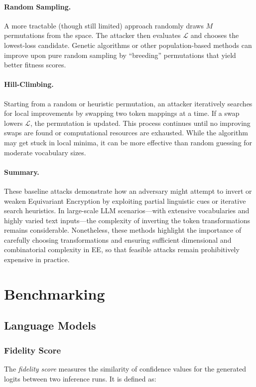 \documentclass[10pt]{article}
\begin{document}
\paragraph{Random Sampling.}
A more tractable (though still limited) approach randomly draws $M$ permutations from the space. The attacker then evaluates $\mathcal{L}$ and chooses the lowest-loss candidate. Genetic algorithms or other population-based methods can improve upon pure random sampling by “breeding” permutations that yield better fitness scores.

\paragraph{Hill-Climbing.}
Starting from a random or heuristic permutation, an attacker iteratively searches for local improvements by swapping two token mappings at a time. If a swap lowers $\mathcal{L}$, the permutation is updated. This process continues until no improving swaps are found or computational resources are exhausted. While the algorithm may get stuck in local minima, it can be more effective than random guessing for moderate vocabulary sizes.

\paragraph{Summary.}
These baseline attacks demonstrate how an adversary might attempt to invert or weaken Equivariant Encryption by exploiting partial linguistic cues or iterative search heuristics. In large-scale LLM scenarios—with extensive vocabularies and highly varied text inputs—the complexity of inverting the token transformations remains considerable. Nonetheless, these methods highlight the importance of carefully choosing transformations and ensuring sufficient dimensional and combinatorial complexity in EE, so that feasible attacks remain prohibitively expensive in practice.

\section{Benchmarking}

\subsection{Language Models}

\subsubsection{Fidelity Score}
The \textit{fidelity score} measures the similarity of confidence values for the generated logits between two inference runs. It is defined as:
\end{document}
